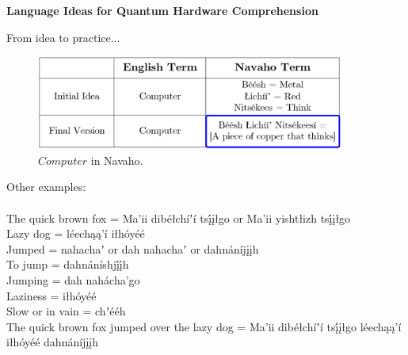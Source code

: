 \begin{center}
\Large\textbf{Language Ideas for Quantum Hardware Comprehension}
\end{center}

\large{From idea to practice... 
\\ 
\space

\begin{figure}[htbp]
    \centering
    \includegraphics[width=0.9\textwidth]{Computer_NV.png}
    \caption{$Computer$ in Navaho.}
    \label{fig:svgImage}
\end{figure}
}

\large{
\noindent
Other examples:
\\ 
\space
\\
The quick brown fox = Ma'ii dibéłchíʼí tsį́įłgo or Ma'ii yishtłizh tsį́įłgo
\\
Lazy dog = léechąą’í iłhóyéé
\\
Jumped = nahachaʼ or dah nahachaʼ or dahnáníjįįh
\\
To jump = dahnáníshjį́į́h
\\
Jumping = dah nahácha’go
\\
Laziness = iłhóyéé
\\
Slow or in vain = chʼééh
\\
The quick brown fox jumped over the lazy dog = Ma'ii dibéłchíʼí tsį́įłgo léechąą’í iłhóyéé dahnáníjįįh
\space
}
